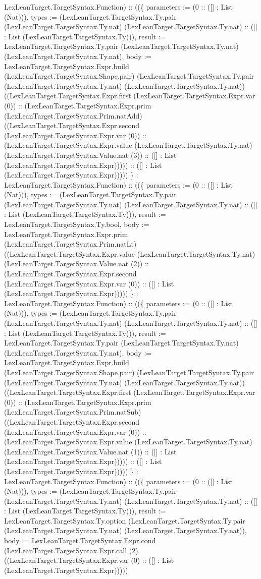 \documentclass[11pt]{article}
\begin{document}
LexLeanTarget.TargetSyntax.Function) :: ((\{ parameters := (0 :: ([] : List (Nat))), types := (LexLeanTarget.TargetSyntax.Ty.pair (LexLeanTarget.TargetSyntax.Ty.nat) (LexLeanTarget.TargetSyntax.Ty.nat) :: ([] : List (LexLeanTarget.TargetSyntax.Ty))), result := LexLeanTarget.TargetSyntax.Ty.pair (LexLeanTarget.TargetSyntax.Ty.nat) (LexLeanTarget.TargetSyntax.Ty.nat), body := LexLeanTarget.TargetSyntax.Expr.build (LexLeanTarget.TargetSyntax.Shape.pair) (LexLeanTarget.TargetSyntax.Ty.pair (LexLeanTarget.TargetSyntax.Ty.nat) (LexLeanTarget.TargetSyntax.Ty.nat)) ((LexLeanTarget.TargetSyntax.Expr.first (LexLeanTarget.TargetSyntax.Expr.var (0)) :: (LexLeanTarget.TargetSyntax.Expr.prim (LexLeanTarget.TargetSyntax.Prim.natAdd) ((LexLeanTarget.TargetSyntax.Expr.second (LexLeanTarget.TargetSyntax.Expr.var (0)) :: (LexLeanTarget.TargetSyntax.Expr.value (LexLeanTarget.TargetSyntax.Ty.nat) (LexLeanTarget.TargetSyntax.Value.nat (3)) :: ([] : List (LexLeanTarget.TargetSyntax.Expr))))) :: ([] : List (LexLeanTarget.TargetSyntax.Expr))))) \} : LexLeanTarget.TargetSyntax.Function) :: ((\{ parameters := (0 :: ([] : List (Nat))), types := (LexLeanTarget.TargetSyntax.Ty.pair (LexLeanTarget.TargetSyntax.Ty.nat) (LexLeanTarget.TargetSyntax.Ty.nat) :: ([] : List (LexLeanTarget.TargetSyntax.Ty))), result := LexLeanTarget.TargetSyntax.Ty.bool, body := LexLeanTarget.TargetSyntax.Expr.prim (LexLeanTarget.TargetSyntax.Prim.natLt) ((LexLeanTarget.TargetSyntax.Expr.value (LexLeanTarget.TargetSyntax.Ty.nat) (LexLeanTarget.TargetSyntax.Value.nat (2)) :: (LexLeanTarget.TargetSyntax.Expr.second (LexLeanTarget.TargetSyntax.Expr.var (0)) :: ([] : List (LexLeanTarget.TargetSyntax.Expr))))) \} : LexLeanTarget.TargetSyntax.Function) :: ((\{ parameters := (0 :: ([] : List (Nat))), types := (LexLeanTarget.TargetSyntax.Ty.pair (LexLeanTarget.TargetSyntax.Ty.nat) (LexLeanTarget.TargetSyntax.Ty.nat) :: ([] : List (LexLeanTarget.TargetSyntax.Ty))), result := LexLeanTarget.TargetSyntax.Ty.pair (LexLeanTarget.TargetSyntax.Ty.nat) (LexLeanTarget.TargetSyntax.Ty.nat), body := LexLeanTarget.TargetSyntax.Expr.build (LexLeanTarget.TargetSyntax.Shape.pair) (LexLeanTarget.TargetSyntax.Ty.pair (LexLeanTarget.TargetSyntax.Ty.nat) (LexLeanTarget.TargetSyntax.Ty.nat)) ((LexLeanTarget.TargetSyntax.Expr.first (LexLeanTarget.TargetSyntax.Expr.var (0)) :: (LexLeanTarget.TargetSyntax.Expr.prim (LexLeanTarget.TargetSyntax.Prim.natSub) ((LexLeanTarget.TargetSyntax.Expr.second (LexLeanTarget.TargetSyntax.Expr.var (0)) :: (LexLeanTarget.TargetSyntax.Expr.value (LexLeanTarget.TargetSyntax.Ty.nat) (LexLeanTarget.TargetSyntax.Value.nat (1)) :: ([] : List (LexLeanTarget.TargetSyntax.Expr))))) :: ([] : List (LexLeanTarget.TargetSyntax.Expr))))) \} : LexLeanTarget.TargetSyntax.Function) :: ((\{ parameters := (0 :: ([] : List (Nat))), types := (LexLeanTarget.TargetSyntax.Ty.pair (LexLeanTarget.TargetSyntax.Ty.nat) (LexLeanTarget.TargetSyntax.Ty.nat) :: ([] : List (LexLeanTarget.TargetSyntax.Ty))), result := LexLeanTarget.TargetSyntax.Ty.option (LexLeanTarget.TargetSyntax.Ty.pair (LexLeanTarget.TargetSyntax.Ty.nat) (LexLeanTarget.TargetSyntax.Ty.nat)), body := LexLeanTarget.TargetSyntax.Expr.cond (LexLeanTarget.TargetSyntax.Expr.call (2) ((LexLeanTarget.TargetSyntax.Expr.var (0) :: ([] : List (LexLeanTarget.TargetSyntax.Expr))))) 
\end{document}
